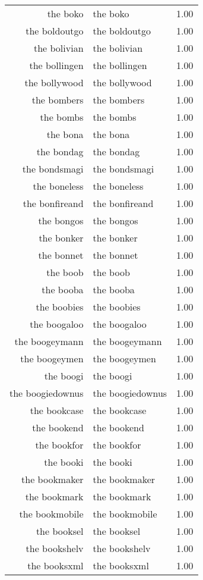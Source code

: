 \begin{table}[ht]
\begin{tabular}{rlr}
  the boko & the boko & 1.00 \\ 
  the boldoutgo & the boldoutgo & 1.00 \\ 
  the bolivian & the bolivian & 1.00 \\ 
  the bollingen & the bollingen & 1.00 \\ 
  the bollywood & the bollywood & 1.00 \\ 
  the bombers & the bombers & 1.00 \\ 
  the bombs & the bombs & 1.00 \\ 
  the bona & the bona & 1.00 \\ 
  the bondag & the bondag & 1.00 \\ 
  the bondsmagi & the bondsmagi & 1.00 \\ 
  the boneless & the boneless & 1.00 \\ 
  the bonfireand & the bonfireand & 1.00 \\ 
  the bongos & the bongos & 1.00 \\ 
  the bonker & the bonker & 1.00 \\ 
  the bonnet & the bonnet & 1.00 \\ 
  the boob & the boob & 1.00 \\ 
  the booba & the booba & 1.00 \\ 
  the boobies & the boobies & 1.00 \\ 
  the boogaloo & the boogaloo & 1.00 \\ 
  the boogeymann & the boogeymann & 1.00 \\ 
  the boogeymen & the boogeymen & 1.00 \\ 
  the boogi & the boogi & 1.00 \\ 
  the boogiedownus & the boogiedownus & 1.00 \\ 
  the bookcase & the bookcase & 1.00 \\ 
  the bookend & the bookend & 1.00 \\ 
  the bookfor & the bookfor & 1.00 \\ 
  the booki & the booki & 1.00 \\ 
  the bookmaker & the bookmaker & 1.00 \\ 
  the bookmark & the bookmark & 1.00 \\ 
  the bookmobile & the bookmobile & 1.00 \\ 
  the booksel & the booksel & 1.00 \\ 
  the bookshelv & the bookshelv & 1.00 \\ 
  the booksxml & the booksxml & 1.00 \\ 

\end{tabular}
\end{table}
